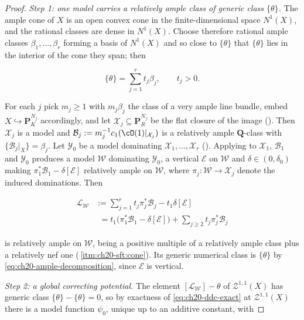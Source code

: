 \begin{proof}
\emph{Step 1: one model carries a relatively ample class of generic class
$\{\theta\}$.}  The ample cone of $X$ is an open convex cone in the
finite-dimensional space $N^1(X)$, and the rational classes are dense in
$N^1(X)$.  Choose therefore rational ample classes
$\beta_1,\ldots,\beta_r$ forming a basis of $N^1(X)$ and so close to
$\{\theta\}$ that $\{\theta\}$ lies in the interior of the cone they
span; then

\begin{equation}
\label{eq:ch20-ample-decomposition}
 \{\theta\}=\sum_{j=1}^rt_j\beta_j,\qquad t_j>0 .
\end{equation}

For each $j$ pick $m_j\geq1$ with $m_j\beta_j$ the class of a very
ample line bundle, embed $X\hookrightarrow\mathbf P^{N_j}_K$ accordingly,
and let $\mathcal X_j\subseteq\mathbf P^{N_j}_R$ be the flat closure of the
image ().  Then $\mathcal X_j$ is a model and
$\mathcal B_j:=m_j^{-1}c_1(\cO(1)|_{\mathcal X_j})$ is a relatively ample
$\mathbf Q$-class with $\{\mathcal B_j|_X\}=\beta_j$.  Let
$\mathcal Y_0$ be a model dominating $\mathcal X_1,\ldots,\mathcal X_r$
().  Applying
 to $\mathcal X_1$, $\mathcal B_1$ and
$\mathcal Y_0$ produces a model $\mathcal W$ dominating
$\mathcal Y_0$, a vertical $\mathcal E$ on $\mathcal W$ and
$\delta\in(0,\delta_0)$ making
$\pi_1^*\mathcal B_1-\delta[\mathcal E]$ relatively ample on
$\mathcal W$, where $\pi_j:\mathcal W\to\mathcal X_j$ denote the induced
dominations.  Then

\[
\begin{aligned}
 \mathcal L_{\mathcal W}
 &:=\sum_{j=1}^rt_j\pi_j^*\mathcal B_j-t_1\delta[\mathcal E]\\
 &\phantom{:}=t_1\bigl(\pi_1^*\mathcal B_1-\delta[\mathcal E]\bigr)
  +\sum_{j\geq2}t_j\pi_j^*\mathcal B_j
\end{aligned}
\]

is relatively ample on $\mathcal W$, being a positive multiple of a
relatively ample class plus a relatively nef one
(\,\cref{itm:ch20-sft:cone}).  Its generic
numerical class is $\{\theta\}$ by
\eqref{eq:ch20-ample-decomposition}, since $\mathcal E$ is vertical.

\emph{Step 2: a global correcting potential.}  The element
$[\mathcal L_{\mathcal W}]-\theta$ of $\mathcal Z^{1,1}(X)$ has generic
class $\{\theta\}-\{\theta\}=0$, so by exactness of
\eqref{eq:ch20-ddc-exact} at $\mathcal Z^{1,1}(X)$ there is a model
function $\psi_0$, unique up to an additive constant, with


\end{proof}
